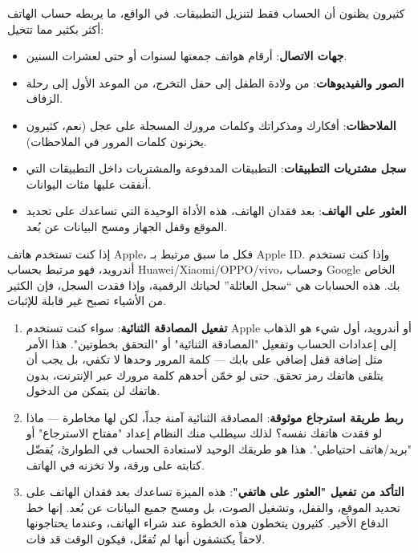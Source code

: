 


كثيرون يظنون أن الحساب فقط لتنزيل التطبيقات. في الواقع، ما يربطه حساب الهاتف أكثر بكثير مما تتخيل:

\begin{itemize}
  \item \textbf{جهات الاتصال}: أرقام هواتف جمعتها لسنوات أو حتى لعشرات السنين.
  \item \textbf{الصور والفيديوهات}: من ولادة الطفل إلى حفل التخرج، من الموعد الأول إلى رحلة الزفاف.
  \item \textbf{الملاحظات}: أفكارك ومذكراتك وكلمات مرورك المسجلة على عجل (نعم، كثيرون يخزنون كلمات المرور في الملاحظات).
  \item \textbf{سجل مشتريات التطبيقات}: التطبيقات المدفوعة والمشتريات داخل التطبيقات التي أنفقت عليها مئات اليوانات.
  \item \textbf{العثور على الهاتف}: بعد فقدان الهاتف، هذه الأداة الوحيدة التي تساعدك على تحديد الموقع وقفل الجهاز ومسح البيانات عن بُعد.
\end{itemize}

إذا كنت تستخدم هاتف Apple، فكل ما سبق مرتبط بـ Apple ID. وإذا كنت تستخدم أندرويد، فهو مرتبط بحساب Huawei/Xiaomi/OPPO/vivo، وحساب Google الخاص بك. هذه الحسابات هي “سجل العائلة” لحياتك الرقمية، وإذا فقدت السجل، فإن الكثير من الأشياء تصبح غير قابلة للإثبات.


\begin{enumerate}
  \item \textbf{تفعيل المصادقة الثنائية}: سواء كنت تستخدم Apple أو أندرويد، أول شيء هو الذهاب إلى إعدادات الحساب وتفعيل "المصادقة الثنائية" أو "التحقق بخطوتين". هذا الأمر مثل إضافة قفل إضافي على بابك — كلمة المرور وحدها لا تكفي، بل يجب أن يتلقى هاتفك رمز تحقق. حتى لو خمّن أحدهم كلمة مرورك عبر الإنترنت، بدون هاتفك لن يتمكن من الدخول.
  \item \textbf{ربط طريقة استرجاع موثوقة}: المصادقة الثنائية آمنة جداً، لكن لها مخاطرة — ماذا لو فقدت هاتفك نفسه؟ لذلك سيطلب منك النظام إعداد "مفتاح الاسترجاع" أو "بريد/هاتف احتياطي". هذا هو طريقك الوحيد لاستعادة الحساب في الطوارئ، يُفضّل كتابته على ورقة، ولا تخزنه في الهاتف.
  \item \textbf{التأكد من تفعيل "العثور على هاتفي"}: هذه الميزة تساعدك بعد فقدان الهاتف على تحديد الموقع، والقفل، وتشغيل الصوت، بل ومسح جميع البيانات عن بُعد. إنها خط الدفاع الأخير. كثيرون يتخطون هذه الخطوة عند شراء الهاتف، وعندما يحتاجونها لاحقاً يكتشفون أنها لم تُفعّل، فيكون الوقت قد فات.
\end{enumerate}

